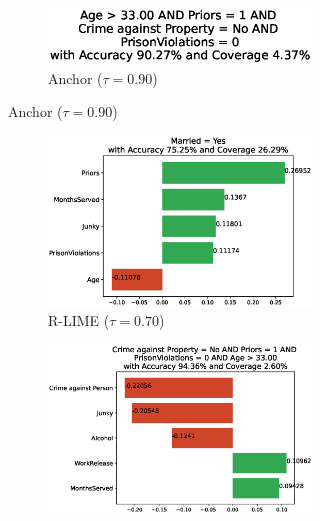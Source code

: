 \documentclass[runningheads]{llncs}
\begin{document}
{\begin{figure}[t]
\begin{subfigure}[t]{0.45\textwidth}
        \vspace{10pt}
        \begin{subfigure}[t]{\textwidth}
          \centering
          \includegraphics[scale=0.33]{src/experiments/exp1/anchor-0012-90}  %
          \caption{Anchor ($\tau=0.90$)}
          \vspace{1.0em}
        \end{subfigure}
      \end{subfigure}
      \hfill
      \begin{subfigure}[t]{0.45\textwidth}
        \begin{subfigure}[t]{\textwidth}
          \hspace{-5pt}
          \includegraphics[scale=\scale]{src/experiments/exp1/rlime-0012-70}  %
          \caption{R-LIME ($\tau=0.70$)}\label{fig:rlime-0-70}
        \end{subfigure}
        \begin{subfigure}[t]{\textwidth}
          \hspace{-17pt}
          \includegraphics[scale=\scale]{src/experiments/exp1/rlime-0012-90}  %

\end{subfigure}
\end{subfigure}
\end{figure}}
\end{document}
